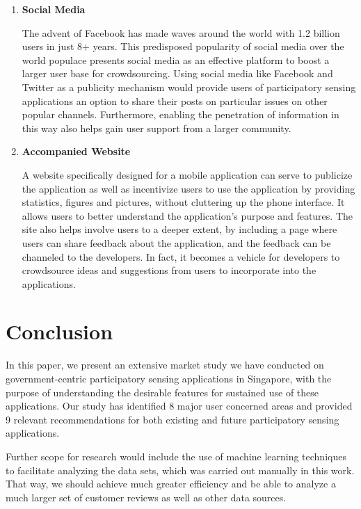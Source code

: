 \documentclass[conference,10pt]{IEEEtran}
\begin{document}
\begin{enumerate}[resume,leftmargin=1.5em]
\item{\textbf{Social Media}} \par The advent of Facebook has made waves around the world with 1.2 billion users in just 8+ years. This predisposed popularity of social media over the world populace presents social media as an effective platform to boost a larger user base for crowdsourcing. Using social media like Facebook and Twitter as a publicity mechanism would provide users of participatory sensing applications an option to share their posts on particular issues on other popular channels. Furthermore, enabling the penetration of information in this way also helps gain user support from a larger community.
\item{\textbf{Accompanied Website}} \par A website specifically designed for a mobile application can serve to publicize the application as well as incentivize users to use the application by providing statistics, figures and pictures, without cluttering up the phone interface. It allows users to better understand the application's purpose and features. The site also helps involve users to a deeper extent, by including a page where users can share feedback about the application, and the feedback can be channeled to the developers. In fact, it becomes a vehicle for developers to crowdsource ideas and suggestions from users to incorporate into the applications.
\end{enumerate}

\section{Conclusion}\label{sec:conclusion}

In this paper, we present an extensive market study we have conducted on government-centric participatory sensing applications in Singapore, with the purpose of understanding the desirable features for sustained use of these applications. Our study has identified 8 major user concerned areas and provided 9 relevant recommendations for both existing and future participatory sensing applications.

Further scope for research would include the use of machine learning techniques to facilitate analyzing the data sets, which was carried out manually in this work. That way, we should achieve much greater efficiency and be able to analyze a much larger set of customer reviews as well as other data sources. 







\end{document}
